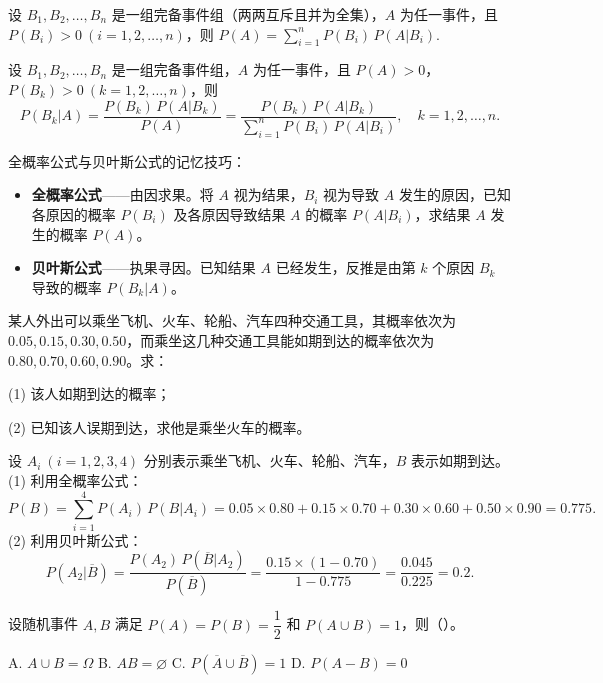 \documentclass[lang=cn,11pt]{elegantbook}
\begin{document}
\begin{theorem}[全概率公式] \label{thm:total-probability}
设 \(B_1, B_2, \dots, B_n\) 是一组完备事件组（两两互斥且并为全集），\(A\) 为任一事件，且 \(P(B_i) > 0\ (i=1,2,\dots,n)\)，则
\(
P(A) = \sum_{i=1}^{n} P(B_i)\,P(A|B_i).
\)
\end{theorem}

\begin{theorem}[贝叶斯公式] \label{thm:bayes}
设 \(B_1, B_2, \dots, B_n\) 是一组完备事件组，\(A\) 为任一事件，且 \(P(A) > 0\)，\(P(B_k) > 0\ (k=1,2,\dots,n)\)，则
\[
P(B_k|A) = \frac{P(B_k)\,P(A|B_k)}{P(A)} = \frac{P(B_k)\,P(A|B_k)}{\sum_{i=1}^{n} P(B_i)\,P(A|B_i)}, \quad k=1,2,\dots,n.
\]
\end{theorem}

\begin{note}
全概率公式与贝叶斯公式的记忆技巧：
\begin{itemize}
    \item \textbf{全概率公式}——由因求果。将 \(A\) 视为结果，\(B_i\) 视为导致 \(A\) 发生的原因，已知各原因的概率 \(P(B_i)\) 及各原因导致结果 \(A\) 的概率 \(P(A|B_i)\)，求结果 \(A\) 发生的概率 \(P(A)\)。
    \item \textbf{贝叶斯公式}——执果寻因。已知结果 \(A\) 已经发生，反推是由第 \(k\) 个原因 \(B_k\) 导致的概率 \(P(B_k|A)\)。
\end{itemize}
\end{note}

\begin{exercise}\label{exer:1-8}
某人外出可以乘坐飞机、火车、轮船、汽车四种交通工具，其概率依次为 \(0.05, 0.15, 0.30, 0.50\)，而乘坐这几种交通工具能如期到达的概率依次为 \(0.80, 0.70, 0.60, 0.90\)。求：
\par
(1) 该人如期到达的概率；\par
(2) 已知该人误期到达，求他是乘坐火车的概率。
\end{exercise}

\begin{solution}
设 \(A_i\ (i=1,2,3,4)\) 分别表示乘坐飞机、火车、轮船、汽车，\(B\) 表示如期到达。\\
(1) 利用全概率公式：
\[
P(B) = \sum_{i=1}^{4} P(A_i)\,P(B|A_i) = 0.05 \times 0.80 + 0.15 \times 0.70 + 0.30 \times 0.60 + 0.50 \times 0.90 = 0.775.
\]
(2) 利用贝叶斯公式：
\[
P(A_2|\overline{B}) = \frac{P(A_2)\,P(\overline{B}|A_2)}{P(\overline{B})} = \frac{0.15 \times (1-0.70)}{1-0.775} = \frac{0.045}{0.225} = 0.2.
\]
\end{solution}


\begin{exercise}\label{exer:1-10}
设随机事件 \(A, B\) 满足 \(P(A)=P(B)=\dfrac{1}{2}\) 和 \(P(A \cup B)=1\)，则（）。\par
A. \(A \cup B = \Omega\)\quad
B. \(AB = \varnothing\)\quad
C. \(P(\overline{A} \cup \overline{B})=1\)\quad
D. \(P(A-B)=0\)
\end{exercise}
\end{document}
